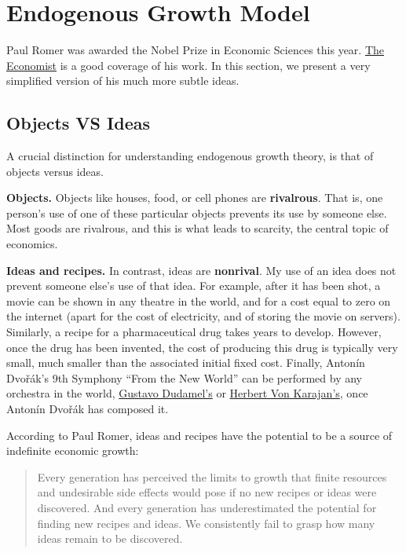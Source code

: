 \documentclass[]{book}
\theoremstyle{definition}
\theoremstyle{definition}
\theoremstyle{definition}
\theoremstyle{remark}
\begin{document}
\hypertarget{endogenous-growth-model}{\section{Endogenous Growth
Model}\label{endogenous-growth-model}}

Paul Romer was awarded the Nobel Prize in Economic Sciences this year.
\href{https://www.economist.com/finance-and-economics/2018/10/13/paul-romer-and-william-nordhaus-win-the-economics-nobel?fsrc=scn/fb/te/bl/ed/paulromerandwilliamnordhauswintheeconomicsnobelfreeexchange}{The
Economist} is a good coverage of his work. In this section, we present a
very simplified version of his much more subtle ideas.

\subsection{Objects VS Ideas}\label{objects-vs-ideas}

A crucial distinction for understanding endogenous growth theory, is
that of objects versus ideas.

\textbf{Objects.} Objects like houses, food, or cell phones are
\textbf{rivalrous}. That is, one person's use of one of these particular
objects prevents its use by someone else. Most goods are rivalrous, and
this is what leads to scarcity, the central topic of economics.

\textbf{Ideas and recipes.} In contrast, ideas are \textbf{nonrival}. My
use of an idea does not prevent someone else's use of that idea. For
example, after it has been shot, a movie can be shown in any theatre in
the world, and for a cost equal to zero on the internet (apart for the
cost of electricity, and of storing the movie on servers). Similarly, a
recipe for a pharmaceutical drug takes years to develop. However, once
the drug has been invented, the cost of producing this drug is typically
very small, much smaller than the associated initial fixed cost.
Finally, Antonín Dvořák's 9th Symphony ``From the New World'' can be
performed by any orchestra in the world,
\href{https://www.youtube.com/watch?v=vHqtJH2f1Yk}{Gustavo Dudamel's} or
\href{https://www.youtube.com/watch?v=0hmjGbh9qdg\&start_radio=1\&list=RD0hmjGbh9qdg\&t=193}{Herbert
Von Karajan's}, once Antonín Dvořák has composed it.

According to Paul Romer, ideas and recipes have the potential to be a
source of indefinite economic growth:

\begin{quote}
Every generation has perceived the limits to growth that finite
resources and undesirable side effects would pose if no new recipes or
ideas were discovered. And every generation has underestimated the
potential for finding new recipes and ideas. We consistently fail to
grasp how many ideas remain to be discovered.
\end{quote}
\end{document}
